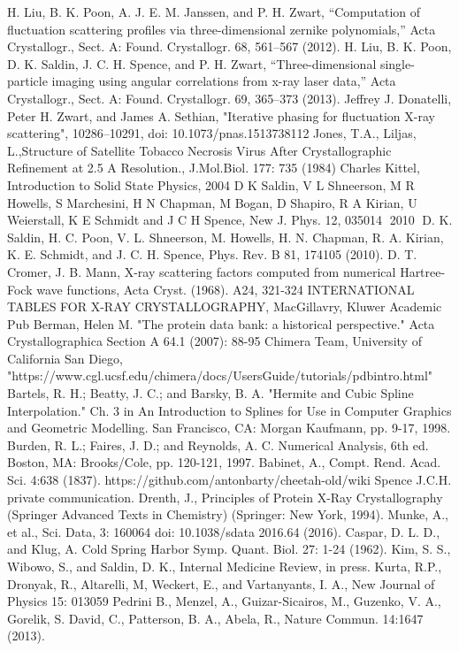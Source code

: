 \begin{thebibliography}{99}
 H. Liu, B. K. Poon, A. J. E. M. Janssen, and P. H. Zwart, “Computation of fluctuation scattering profiles via three-dimensional zernike polynomials,” Acta Crystallogr., Sect. A: Found. Crystallogr. 68, 561–567 (2012).
 H. Liu, B. K. Poon, D. K. Saldin, J. C. H. Spence, and P. H. Zwart, “Three-dimensional single-particle imaging using angular correlations from x-ray laser data,” Acta Crystallogr., Sect. A: Found. Crystallogr. 69, 365–373 (2013).
 Jeffrey J. Donatelli, Peter H. Zwart, and James A. Sethian, "Iterative phasing for fluctuation X-ray scattering", 10286–10291, doi: 10.1073/pnas.1513738112
 Jones, T.A., Liljas, L.,Structure of Satellite Tobacco Necrosis Virus After Crystallographic Refinement at 2.5 A Resolution., J.Mol.Biol. 177: 735 (1984)
 Charles Kittel, Introduction to Solid State Physics, 2004 
 D K Saldin, V L Shneerson, M R Howells, S Marchesini, H N Chapman, M Bogan, D Shapiro, R A Kirian, U Weierstall, K E Schmidt and J C H Spence, New J. Phys. 12, 035014 􏰈2010􏰉
 D. K. Saldin, H. C. Poon, V. L. Shneerson, M. Howells, H. N. Chapman, R. A. Kirian, K. E. Schmidt, and J. C. H. Spence, Phys. Rev. B 81, 174105 (2010).
D. T. Cromer, J. B. Mann, X-ray scattering factors computed from numerical Hartree-Fock wave functions, Acta Cryst. (1968). A24, 321-324
INTERNATIONAL TABLES FOR X-RAY CRYSTALLOGRAPHY, MacGillavry, Kluwer Academic Pub
 Berman, Helen M. "The protein data bank: a historical perspective." Acta Crystallographica Section A 64.1 (2007): 88-95
 Chimera Team, University of California San Diego, "https://www.cgl.ucsf.edu/chimera/docs/UsersGuide/tutorials/pdbintro.html"
 Bartels, R. H.; Beatty, J. C.; and Barsky, B. A. "Hermite and Cubic Spline Interpolation." Ch. 3 in An Introduction to Splines for Use in Computer Graphics and Geometric Modelling. San Francisco, CA: Morgan Kaufmann, pp. 9-17, 1998.
Burden, R. L.; Faires, J. D.; and Reynolds, A. C. Numerical Analysis, 6th ed. Boston, MA: Brooks/Cole, pp. 120-121, 1997.
 Babinet, A.,  Compt. Rend. Acad. Sci. 4:638 (1837).
  https://github.com/antonbarty/cheetah-old/wiki
 Spence J.C.H. private communication.
 Drenth, J., Principles of Protein X-Ray Crystallography (Springer Advanced Texts in Chemistry) (Springer: New York, 1994).
 Munke, A., et al., Sci. Data, 3: 160064 doi: 10.1038/sdata 2016.64 (2016).
 Caspar, D. L. D., and Klug, A. Cold Spring Harbor Symp. Quant. Biol. 27: 1-24 (1962).
 Kim, S. S., Wibowo, S., and Saldin, D. K., Internal Medicine Review, in press.
 Kurta, R.P., Dronyak, R., Altarelli, M, Weckert, E., and Vartanyants, I. A., New Journal of Physics 15: 013059
 Pedrini B., Menzel, A., Guizar-Sicairos, M., Guzenko, V. A.,  Gorelik, S. David, C., Patterson, B. A., Abela, R., Nature Commun. 14:1647 (2013).
\end{thebibliography}

